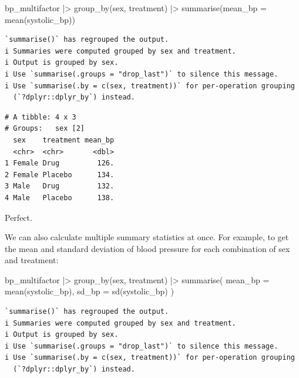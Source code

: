 \documentclass[
  letterpaper,
  8pt,
  a4paper]{book}
\newenvironment{Shaded}{\begin{snugshade}}{\end{snugshade}}
\newcommand{\AttributeTok}[1]{\textcolor[rgb]{0.40,0.45,0.13}{#1}}
\newcommand{\FunctionTok}[1]{\textcolor[rgb]{0.28,0.35,0.67}{#1}}
\newcommand{\NormalTok}[1]{\textcolor[rgb]{0.00,0.23,0.31}{#1}}
\newcommand{\SpecialCharTok}[1]{\textcolor[rgb]{0.37,0.37,0.37}{#1}}
\begin{document}
\begin{Shaded}
\begin{Highlighting}[]
\NormalTok{bp\_multifactor }\SpecialCharTok{|\textgreater{}}
  \FunctionTok{group\_by}\NormalTok{(sex, treatment) }\SpecialCharTok{|\textgreater{}}
  \FunctionTok{summarise}\NormalTok{(}\AttributeTok{mean\_bp =} \FunctionTok{mean}\NormalTok{(systolic\_bp))}
\end{Highlighting}
\end{Shaded}

\begin{verbatim}
`summarise()` has regrouped the output.
i Summaries were computed grouped by sex and treatment.
i Output is grouped by sex.
i Use `summarise(.groups = "drop_last")` to silence this message.
i Use `summarise(.by = c(sex, treatment))` for per-operation grouping
  (`?dplyr::dplyr_by`) instead.
\end{verbatim}

\begin{verbatim}
# A tibble: 4 x 3
# Groups:   sex [2]
  sex    treatment mean_bp
  <chr>  <chr>       <dbl>
1 Female Drug         126.
2 Female Placebo      134.
3 Male   Drug         132.
4 Male   Placebo      138.
\end{verbatim}

Perfect.

We can also calculate multiple summary statistics at once. For example,
to get the mean and standard deviation of blood pressure for each
combination of sex and treatment:

\begin{Shaded}
\begin{Highlighting}[]
\NormalTok{bp\_multifactor }\SpecialCharTok{|\textgreater{}}
  \FunctionTok{group\_by}\NormalTok{(sex, treatment) }\SpecialCharTok{|\textgreater{}}
  \FunctionTok{summarise}\NormalTok{(}
    \AttributeTok{mean\_bp =} \FunctionTok{mean}\NormalTok{(systolic\_bp),}
    \AttributeTok{sd\_bp =} \FunctionTok{sd}\NormalTok{(systolic\_bp)}
\NormalTok{  )}
\end{Highlighting}
\end{Shaded}

\begin{verbatim}
`summarise()` has regrouped the output.
i Summaries were computed grouped by sex and treatment.
i Output is grouped by sex.
i Use `summarise(.groups = "drop_last")` to silence this message.
i Use `summarise(.by = c(sex, treatment))` for per-operation grouping
  (`?dplyr::dplyr_by`) instead.
\end{verbatim}
\end{document}
